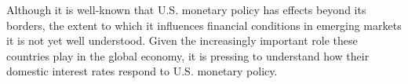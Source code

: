 Although it is well-known that U.S. monetary policy has effects beyond its borders, the extent to which it influences financial conditions in emerging markets it is not yet well understood.
Given the increasingly important role these countries play in the global economy, it is pressing to understand how their domestic interest rates respond to U.S. monetary policy.




